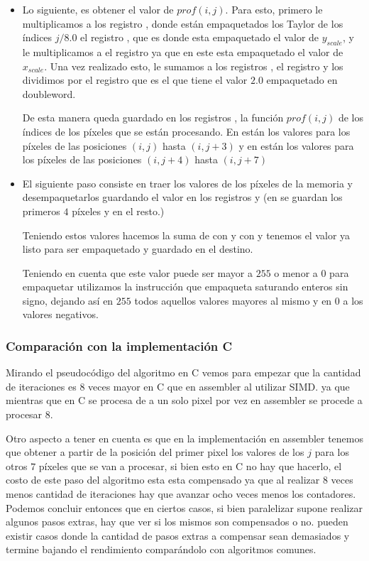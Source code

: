 \begin{itemize}
  \item Lo siguiente, es obtener el valor de $prof(i,j)$. Para esto, primero le multiplicamos a los registro ,  donde están empaquetados los Taylor de los índices $j/8.0$ el registro , que es donde esta empaquetado el valor de $y_{scale}$, y le multiplicamos  a  el registro  ya que en este esta empaquetado el valor de $x_{scale}$. Una vez realizado esto, le sumamos a los registros ,  el registro  y los dividimos por el registro  que es el que tiene el valor $2.0$ empaquetado en doubleword.

  De esta manera queda guardado en los registros ,  la función $prof(i,j)$ de los índices de los píxeles que se están procesando. En  están los valores para los píxeles de las posiciones $(i,j)$ hasta $(i,j+3)$ y en  están los valores para los píxeles de las posiciones $(i,j+4)$ hasta $(i,j+7)$

  \item El siguiente paso consiste en traer los valores de los píxeles de la memoria y desempaquetarlos guardando el valor en los registros  y  (en  se guardan los primeros $4$ píxeles y en  el resto.)

  Teniendo estos valores hacemos la suma de  con  y  con  y tenemos el valor ya listo para ser empaquetado y guardado en el destino.

  Teniendo en cuenta que este valor puede ser mayor a $255$ o menor a $0$ para empaquetar utilizamos la instrucción  que empaqueta saturando enteros sin signo, dejando así en $255$ todos aquellos valores mayores al mismo y en $0$ a los valores negativos.
\end{itemize}

\subsubsection{Comparación con la implementación C}

Mirando el pseudocódigo del algoritmo en C vemos para empezar que la cantidad de iteraciones es 8 veces mayor en C que en assembler al utilizar SIMD. ya que mientras que en C se procesa de a un solo pixel por vez en assembler se procede a procesar 8.

Otro aspecto a tener en cuenta es que en la implementación en assembler tenemos que obtener a partir de la posición del primer pixel los valores de los $j$ para los otros $7$ píxeles que se van a procesar, si bien esto en C no hay que hacerlo, el costo de este paso del algoritmo esta esta compensado ya que al realizar 8 veces menos cantidad de iteraciones hay que avanzar ocho veces menos los contadores. Podemos concluir entonces que en ciertos casos, si bien paralelizar supone realizar algunos pasos extras, hay que ver si los mismos son compensados o no. pueden existir casos donde la cantidad de pasos extras a compensar sean demasiados y termine bajando el rendimiento comparándolo con algoritmos comunes.


